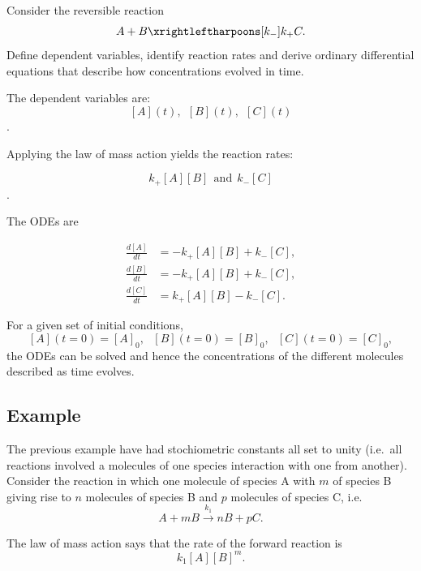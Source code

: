 \documentclass[
  letterpaper,
  DIV=11,
  numbers=noendperiod]{scrreprt}
\begin{document}
\begin{tcolorbox}[enhanced jigsaw, bottomtitle=1mm, rightrule=.15mm, colback=white, leftrule=.75mm, title=\textcolor{quarto-callout-note-color}{\faInfo}\hspace{0.5em}{Note}, bottomrule=.15mm, coltitle=black, toptitle=1mm, breakable, colframe=quarto-callout-note-color-frame, titlerule=0mm, toprule=.15mm, opacitybacktitle=0.6, arc=.35mm, colbacktitle=quarto-callout-note-color!10!white, left=2mm, opacityback=0]

Consider the reversible reaction \[
A+B  \xrightleftharpoons[k_{-}]{k_{+}}  C.
\] Define dependent variables, identify reaction rates and derive
ordinary differential equations that describe how concentrations evolved
in time.

The dependent variables are: \[ [A](t), \ \ [B](t), \ \ [C](t) \].

Applying the law of mass action yields the reaction rates:

\[ k_+[A][B] \ \ \textrm{and} \ \ k_-[C]\].

The ODEs are

\[
\begin{aligned}
\frac{d[A]}{dt}&=-k_+[A][B]+k_-[C], \nonumber\\
\frac{d[B]}{dt}&=-k_+[A][B]+k_-[C], \nonumber\\
\frac{d[C]}{dt}&=k_+[A][B]-k_-[C]. \nonumber
\end{aligned}
\]

For a given set of initial conditions, \[
[A](t=0)=[A]_0, \ \ \ [B](t=0)=[B]_0, \ \ \ [C](t=0)=[C]_0,
\] the ODEs can be solved and hence the concentrations of the different
molecules described as time evolves.

\end{tcolorbox}

\hypertarget{example}{%
\subsection{Example}\label{example}}

The previous example have had stochiometric constants all set to unity
(i.e.~all reactions involved a molecules of one species interaction with
one from another). Consider the reaction in which one molecule of
species A with \(m\) of species B giving rise to \(n\) molecules of
species B and \(p\) molecules of species C, i.e. \[
A+mB \xrightarrow{k_1} nB + pC.
\]

The law of mass action says that the rate of the forward reaction is \[
k_1[A][B]^m.
\]
\end{document}

